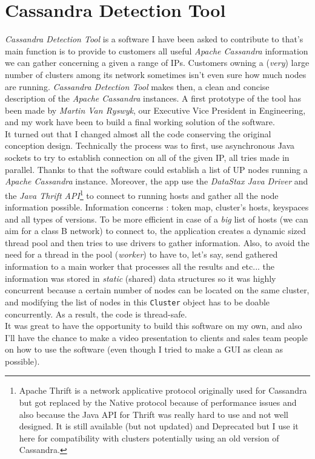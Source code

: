 \documentclass[a4paper]{report}
\newcommand{\djd}{\emph{DataStax Java Driver\xspace}}
\newcommand{\ca}{\emph{Apache Cassandra\xspace}}
\begin{document}
\chapter{Cassandra Detection Tool}
\emph{Cassandra Detection Tool} is a software I have been asked to contribute to that's main function is to provide to customers all useful \ca{} information we can gather concerning a given a range of IPs. Customers owning a (\emph{very}) large number of clusters among its network sometimes isn't even sure how much nodes are running. \emph{Cassandra Detection Tool} makes then, a clean and concise description of the \ca{} instances. 
A first prototype of the tool has been made by \emph{Martin Van Ryswyk}, our Executive Vice President in Engineering, and my work have been to build a final working solution of the software.\\
It turned out that I changed almost all the code conserving the original conception design. Technically the process was to first, use asynchronous Java sockets to try to establish connection on all of the given IP, all tries made in parallel. Thanks to that the software could establish a list of UP nodes running a \ca{} instance. Moreover, the app use the \djd{} and  the \emph{Java Thrift API}\footnote{Apache Thrift is a network applicative protocol originally used for Cassandra but got replaced by the Native protocol because of performance issues and also because the Java API for Thrift was really hard to use and not well designed. It is still available (but not updated) and Deprecated but I use it here for compatibility with clusters potentially using an old version of Cassandra.}
to connect to running hosts and gather all the node information possible. Information concerns : token map, cluster's hosts, keyspaces and all types of versions. To be more efficient in case of a \emph{big} list of hosts (we can aim for a class B network) to connect to, the application creates a dynamic sized thread pool and then tries to use drivers to gather information. Also, to avoid the need for a thread in the pool (\emph{worker}) to have to, let's say, send gathered information to a main worker that processes all the results and etc... the information was stored in \emph{static} (shared) data structures so it was highly concurrent because a certain number of nodes can be located on the same cluster, and modifying the list of nodes in this \verb;Cluster; object has to be doable concurrently. As a result, the code is thread-safe.\\
It was great to have the opportunity to build this software on my own, and also I'll have the chance to make a video presentation to clients and sales team people on how to use the software (even though I tried to make a GUI as clean as possible).
\end{document}
